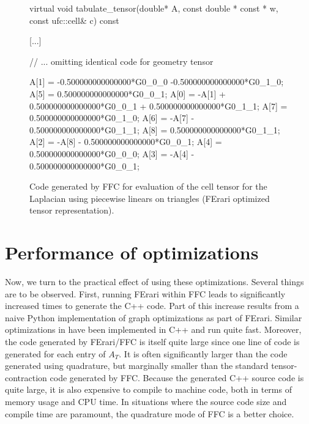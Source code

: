 \begin{figure}
  \scriptsize
  \begin{c++}
virtual void tabulate_tensor(double* A,
                             const double * const * w,
                             const ufc::cell& c) const
{
  [...]

  // ... omitting identical code for geometry tensor

  A[1] = -0.500000000000000*G0_0_0
         -0.500000000000000*G0_1_0;
  A[5] = 0.500000000000000*G0_0_1;
  A[0] = -A[1] +
         0.500000000000000*G0_0_1 +
         0.500000000000000*G0_1_1;
  A[7] = 0.500000000000000*G0_1_0;
  A[6] = -A[7] - 0.500000000000000*G0_1_1;
  A[8] = 0.500000000000000*G0_1_1;
  A[2] = -A[8] - 0.500000000000000*G0_0_1;
  A[4] = 0.500000000000000*G0_0_0;
  A[3] = -A[4] - 0.500000000000000*G0_0_1;
}
  \end{c++}
  \caption{Code generated by FFC for evaluation of the cell tensor for
    the Laplacian using piecewise linears on triangles (FErari
    optimized tensor representation).}
  \label{fig:code,poisson,optimized}
\end{figure}

\section{Performance of optimizations}

Now, we turn to the practical effect of using these optimizations.
Several things are to be observed. First, running FErari within FFC
leads to significantly increased times to generate the C++ code. Part
of this increase results from a naive Python implementation of graph
optimizations as part of FErari. Similar optimizations
in \citet{WolfHeath2009} have been implemented in C++ and run quite
fast. Moreover, the code generated by FErari/FFC is itself quite large
since one line of code is generated for each entry of $A_T$. It is
often significantly larger than the code generated using quadrature,
but marginally smaller than the standard tensor-contraction code
generated by FFC. Because the generated C++ source code is quite
large, it is also expensive to compile to machine code, both in terms
of memory usage and CPU time. In situations where the source code size
and compile time are paramount, the quadrature mode of FFC is a better
choice.

